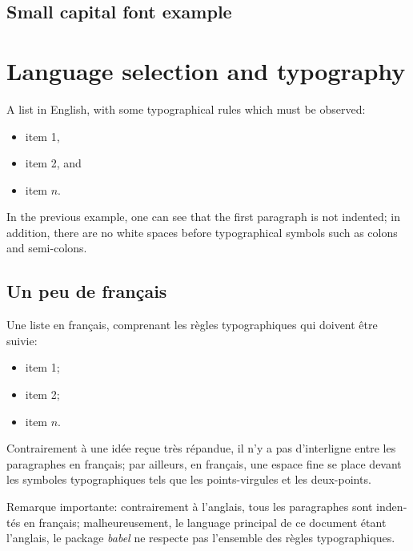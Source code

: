 \documentclass[11pt, a4paper, english]{report}
\begin{document}
		\textbf{\textit{\lipsum[1]}}
		
	
	\section{Small capital font example}
	
		\textsc{\lipsum[1]}
	

\chapter{Language selection and typography}

	A list in English, with some typographical rules which must be observed:
	\begin{itemize}
		\item item 1,
		\item item 2, and
		\item item $n$.
	\end{itemize}

	In the previous example, one can see that the first paragraph is not indented; in addition, there are no white spaces before typographical symbols such as colons and semi-colons.
	
	
	\begin{otherlanguage}{french}%
		\section{Un peu de français}
		
		Une liste en français, comprenant les règles typographiques qui doivent être suivie:
		\begin{itemize}
			\item item 1;
			\item item 2;
			\item item $n$.
		\end{itemize}
		
		Contrairement à une idée reçue très répandue, il n'y a pas d'interligne entre les paragraphes en français; par ailleurs, en français, une espace fine se place devant les symboles typographiques tels que les points-virgules et les deux-points.
		
		Remarque importante: contrairement à l'anglais, tous les paragraphes sont indentés en français; malheureusement, le language principal de ce document étant l'anglais, le package \textit{babel} ne respecte pas l'ensemble des règles typographiques.
	\end{otherlanguage}

\end{document}
